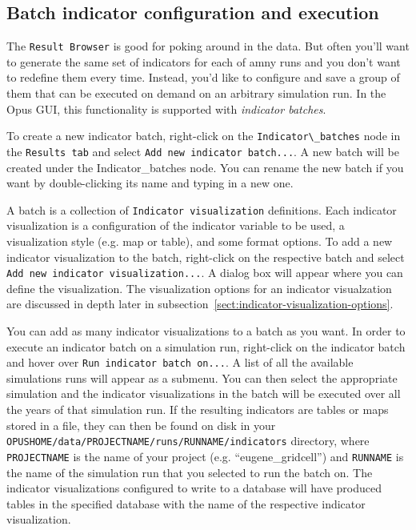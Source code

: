 \subsection{Batch indicator configuration and execution}

The \verb#Result Browser# is good for poking around in the
data. But often you'll want to generate the same
set of indicators for each of amny runs and you don't want to
redefine them every time. Instead, you'd like to configure and save a
group of them that can be executed on demand on an arbitrary
simulation run. In the Opus GUI, this functionality is supported with
\emph{indicator batches}. 

To create a new indicator batch, right-click on the
\verb#Indicator\_batches# node in the \verb#Results tab# and select
\verb#Add new indicator batch...#. A new batch will be created
under the Indicator\_batches node. You can rename the new batch if you
want by double-clicking its name and typing in a new one.

A batch is a collection of \verb#Indicator visualization#
definitions. Each indicator visualization is a configuration of
the indicator variable to be used, a visualization style (e.g. map or
table), and some format options. To add a new indicator visualization
to the batch, right-click on the respective batch and select
\verb#Add new indicator visualization...#. A dialog box will
appear where you can define the visualization. The visualization
options for an indicator visualzation are discussed in depth later in
subsection~\ref{sect:indicator-visualization-options}.

You can add as many indicator visualizations to a batch as you want.
In order to execute an indicator batch on a simulation run,
right-click on the indicator batch and hover over 
\verb#Run indicator batch on...#. A list of all the available
simulations runs will appear as a submenu. You can then select the appropriate simulation
and the indicator visualizations in the batch will be executed over
all the years of that simulation run. If the resulting indicators are
tables or maps stored in a file, they can then be found on disk in
your \verb#OPUSHOME/data/PROJECTNAME/runs/RUNNAME/indicators#
directory, where \verb#PROJECTNAME# is the name of your project (e.g.
``eugene\_gridcell'') and \verb#RUNNAME# is the name of the
simulation run that you selected to run the batch on. The indicator
visualizations configured to write to a database will have produced
tables in the specified database with the name of the respective
indicator visualization. 


